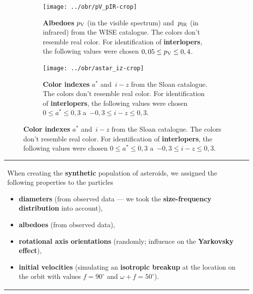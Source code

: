\documentclass{beamer}
\newlength{\sep}
\newlength{\vyska}
\newlength{\vyskaB}
\newlength{\main}
\begin{document}
\begin{frame}
\begin{columns}[t]
\begin{column}{\main}
\begin{tcolorbox}[title=Identification of members of the Eunomia family\vphantom{Úy},height=0.25\vyskaB]
\begin{figure}[htbp]
\begin{subfigure}[b]{0.26\textwidth}
		\end{subfigure}
		\begin{subfigure}[b]{0.2\textwidth}
			\centering
			\captionsetup{width=.88\linewidth}
			\texttt{[image: ../obr/pV\_pIR-crop]}
			\caption{\textbf{Albedoes} $p_{\rm V}$ (in the visible spectrum) and~$p_{\rm IR}$ (in infrared) from the WISE catalogue. The colors don't resemble real color. For identification of \textbf{interlopers}, the following values were chosen $0,05 \leq p_{\rm V} \leq 0,4$.\newline}
		\end{subfigure}
		\begin{subfigure}[b]{0.2\textwidth}
			\centering
			\captionsetup{width=.88\linewidth}
			\texttt{[image: ../obr/astar\_iz-crop]}
			\caption{\textbf{Color indexes} $a^*$ and~$i-z$ from the Sloan catalogue\cite{ivezic01}. The colors don't resemble real color. For identification of \textbf{interlopers}, the following values were chosen $0\leq a^* \leq 0,3$ a~$-0,3\leq i-z \leq 0,3$.\newline\newline}
		\end{subfigure}
	\end{figure}

\end{tcolorbox}

\vspace{\sep}

\begin{tcolorbox}[title=Simulation of orbital evolution\vphantom{Úy},height=0.75\vyskaB]
	\begin{tabularx}{\textwidth}{Xp{}}

	When creating the \textbf{synthetic} population of asteroids, we assigned the following properties to the particles
	\begin{itemize}
	\item \textbf{diameters} (from observed data --- we took the \textbf{size-frequency distribution} into account), 
	\item \textbf{albedoes} (from observed data),
	\item \textbf{rotational axis orientations} (randomly; influence on the \textbf{Yarkovsky effect}),
	\item \textbf{initial velocities} (simulating an \textbf{isotropic breakup} at the location on the orbit with values $f=90^\circ$ and $\omega+f=50^\circ$).
	\end{itemize}


\end{tabularx}
\end{tcolorbox}
\end{column}
\end{columns}
\end{frame}
\end{document}
